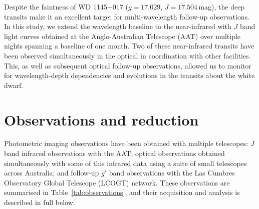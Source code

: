 \documentclass[apj]{emulateapj}
\begin{document}
Despite the faintness of WD 1145+017 ($g=17.029$, $J=17.504$\,mag), the deep transits make it an excellent target for multi-wavelength follow-up observations. In this study, we extend the wavelength baseline to the near-infrared with $J$ band light curves obtained at the Anglo-Australian Telescope (AAT) over multiple nights spanning a baseline of one month. Two of these near-infrared transits have been observed simultaneously in the optical in coordination with other facilities. This, as well as subsequent optical follow-up observations, allowed us to monitor for wavelength-depth dependencies and evolutions in the transits about the white dwarf.

\section{Observations and reduction}
\label{sec:observations}

Photometric imaging observations have been obtained with multiple telescopes: $J$ band infrared observations with the AAT; optical observations 
obtained simultaneously with some of this infrared data using a suite of small telescopes across Australia; and follow-up $g'$ band observations with the Las Cumbres Observatory Global Telescope (LCOGT) network. These observations are summarised in Table~\ref{tab:observations}, and their acquisition and analysis is described in full below.
\end{document}
